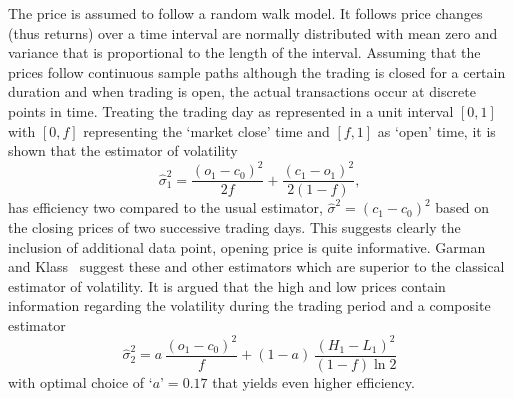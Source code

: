 The price is assumed to follow a random walk model. It follows price changes (thus returns) over a time interval are normally distributed with mean zero and variance that is proportional to the length of the interval. Assuming that the prices follow continuous sample paths although the trading is closed for a certain duration and when trading is open, the actual transactions occur at discrete points in time. Treating the trading day as represented in a unit interval $[0,1]$ with $[0,f]$ representing the `market close' time and $[f,1]$ as `open' time, it is shown that the estimator of volatility
	\begin{equation}\label{eqn:estvol}
	\hat{\sigma}_1^2= \dfrac{(o_1 - c_0)^2}{2f} + \dfrac{(c_1 - o_1)^2}{2(1-f)},
	\end{equation}
has efficiency two compared to the usual estimator, $\hat{\sigma}^2=(c_1-c_0)^2$ based on the closing prices of two successive trading days. This suggests clearly the inclusion of additional data point, opening price is quite informative. Garman and Klass~\cite{klass1980} suggest these and other estimators which are superior to the classical estimator of volatility. It is argued that the high and low prices contain information regarding the volatility during the trading period and a composite estimator
	\begin{equation}\label{eqn:compositeest}
	\hat{\sigma}_2^2= a\,\dfrac{(o_1- c_0)^2}{f} + (1-a)\, \dfrac{(H_1 - L_1)^2}{(1-f) \ln 2}
	\end{equation}
with optimal choice of `$a$'$=0.17$ that yields even higher efficiency.


